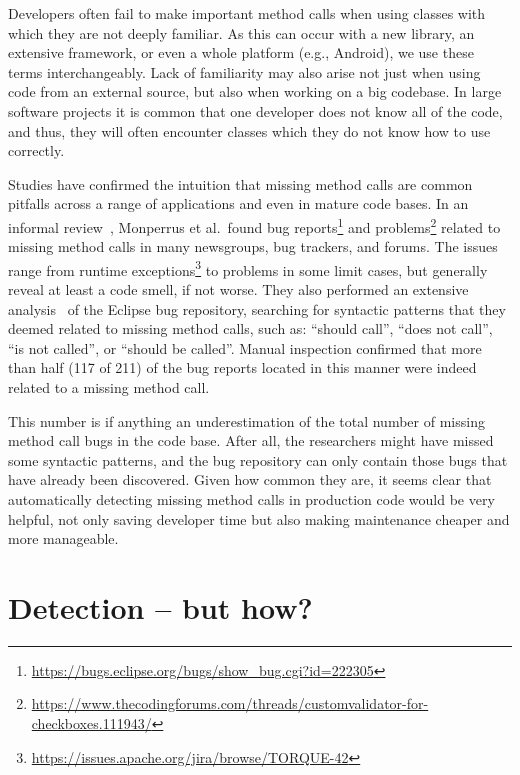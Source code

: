 Developers often fail to make important method calls when using classes with which they are not deeply familiar.
As this can occur with a new library, an extensive framework, or even a whole platform (e.g., Android), we use these terms interchangeably.
Lack of familiarity may also arise not just when using code from an external source, but also when working on a big codebase.
In large software projects it is common that one developer does not know all of the code, and thus, they will often encounter classes which they do not know how to use correctly.

Studies have confirmed the intuition that missing method calls are common pitfalls across a range of applications and even in mature code bases.
In an informal review~\cite{monperrus2010detecting}, Monperrus et al.\ found bug reports\footnote{\url{https://bugs.eclipse.org/bugs/show_bug.cgi?id=222305}} and problems\footnote{\url{https://www.thecodingforums.com/threads/customvalidator-for-checkboxes.111943/}} related to missing method calls in many newsgroups, bug trackers, and forums.
The issues range from runtime exceptions\footnote{\url{https://issues.apache.org/jira/browse/TORQUE-42}} to problems in some limit cases, but generally reveal at least a code smell, if not worse.
They also performed an extensive analysis~\cite{monperrus2013detecting} of the Eclipse bug repository,
searching for syntactic patterns that they deemed related to missing method calls, such as: ``should call'', ``does not call'', ``is not called'', or ``should be called''.
Manual inspection confirmed that more than half (117 of 211) of the bug reports located in this manner were indeed related to a missing method call.

This number is if anything an underestimation of the total number of missing method call bugs in the code base.
After all, the researchers might have missed some syntactic patterns, and the bug repository can only contain those bugs that have already been discovered.
Given how common they are, it seems clear that automatically detecting missing method calls in production code would be very helpful, not only saving developer time but also making maintenance cheaper and more manageable.

\section{Detection -- but how?}

